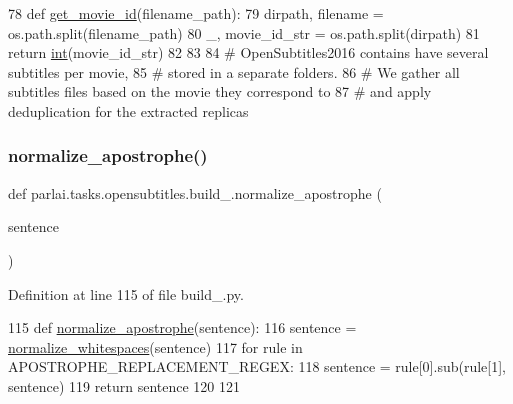 \begin{DoxyCode}
78 \textcolor{keyword}{def }\hyperlink{namespaceparlai_1_1tasks_1_1opensubtitles_1_1build__2018_a6f66d00bdef41302d4c072958f8758a2}{get\_movie\_id}(filename\_path):
79     dirpath, filename = os.path.split(filename\_path)
80     \_, movie\_id\_str = os.path.split(dirpath)
81     \textcolor{keywordflow}{return} \hyperlink{namespacelanguage__model_1_1eval__ppl_a7d12ee00479673c5c8d1f6d01faa272a}{int}(movie\_id\_str)
82 
83 
84 \textcolor{comment}{# OpenSubtitles2016 contains have several subtitles per movie,}
85 \textcolor{comment}{# stored in a separate folders.}
86 \textcolor{comment}{# We gather all subtitles files based on the movie they correspond to}
87 \textcolor{comment}{# and apply deduplication for the extracted replicas}
\end{DoxyCode}
\mbox{\label{namespaceparlai_1_1tasks_1_1opensubtitles_1_1build__2018_a37607fa72082c0a8d4606157840496a7}} 
\subsubsection{\texorpdfstring{normalize\+\_\+apostrophe()}{normalize\_apostrophe()}}
{\footnotesize\ttfamily def parlai.\+tasks.\+opensubtitles.\+build\+\_.\+normalize\+\_\+apostrophe (\begin{DoxyParamCaption}\item[{}]{sentence }\end{DoxyParamCaption})}



Definition at line 115 of file build\+\_.\+py.


\begin{DoxyCode}
115 \textcolor{keyword}{def }\hyperlink{namespaceparlai_1_1tasks_1_1opensubtitles_1_1build__2018_a37607fa72082c0a8d4606157840496a7}{normalize\_apostrophe}(sentence):
116     sentence = \hyperlink{namespaceparlai_1_1tasks_1_1opensubtitles_1_1build__2018_ae4802978106d19e628d0024c8404cab6}{normalize\_whitespaces}(sentence)
117     \textcolor{keywordflow}{for} rule \textcolor{keywordflow}{in} APOSTROPHE\_REPLACEMENT\_REGEX:
118         sentence = rule[0].sub(rule[1], sentence)
119     \textcolor{keywordflow}{return} sentence
120 
121 
\end{DoxyCode}
\mbox{\label{namespaceparlai_1_1tasks_1_1opensubtitles_1_1build__2018_ae4802978106d19e628d0024c8404cab6}} 
